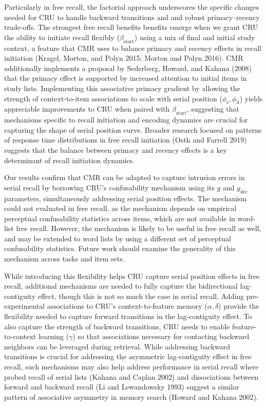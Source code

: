 \documentclass[
  letterpaper,
  DIV=11,
  numbers=noendperiod]{scrartcl}
\begin{document}
Particularly in free recall, the factorial approach underscores the
specific changes needed for CRU to handle backward transitions and and
robust primacy--recency trade-offs. The strongest free recall benefits
benefits emerge when we grant CRU the ability to initiate recall
flexibly (\(\beta_\text{start}\)) using a mix of final and initial study
context, a feature that CMR uses to balance primacy and recency effects
in recall initiation (Kragel, Morton, and Polyn 2015; Morton and Polyn
2016). CMR additionally implements a proposal by Sederberg, Howard, and
Kahana (2008) that the primacy effect is supported by increased
attention to initial items in study lists. Implementing this associative
primacy gradient by allowing the strength of context-to-item
associations to scale with serial position
(\(\phi_\text{s}, \phi_\text{d}\)) yields appreciable improvements to
CRU when paired with \(\beta_\text{start}\), suggesting that mechanisms
specific to recall initiation and encoding dynamics are crucial for
capturing the shape of serial position curve. Broader research focused
on patterns of response time distributions in free recall initiation
(Osth and Farrell 2019) suggests that the balance between primacy and
recency effects is a key determinant of recall initiation dynamics.

Our results confirm that CMR can be adapted to capture intrusion errors
in serial recall by borrowing CRU's confusability mechanism using its
\(g\) and \(g_\text{dec}\) parameters, simultaneously addressing serial
position effects. The mechanism could not evaluated in free recall, as
the mechanism depends on empirical perceptual confusability statistics
across items, which are not available in word-list free recall. However,
the mechanism is likely to be useful in free recall as well, and may be
extended to word lists by using a different set of perceptual
confusability statistics. Future work should examine the generality of
this mechanism across tasks and item sets.

While introducing this flexibility helps CRU capture serial position
effects in free recall, additional mechanisms are needed to fully
capture the bidirectional lag-contiguity effect, though this is not so
much the case in serial recall. Adding pre-experimental associations to
CRU's context-to-feature memory (\(\alpha, \delta\)) provide the
flexibility needed to capture forward transitions in the lag-contiguity
effect. To also capture the strength of backward transitions, CRU needs
to enable feature-to-context learning (\(\gamma\)) so that associations
necessary for contacting backward neighbors can be leveraged during
retrieval. While addressing backward transitions is crucial for
addressing the asymmetric lag-contiguity effect in free recall, such
mechanisms may also help address performance in serial recall where
probed recall of serial lists (Kahana and Caplan 2002) and dissociations
between forward and backward recall (Li and Lewandowsky 1993) suggest a
similar pattern of associative asymmetry in memory search (Howard and
Kahana 2002).
\end{document}

